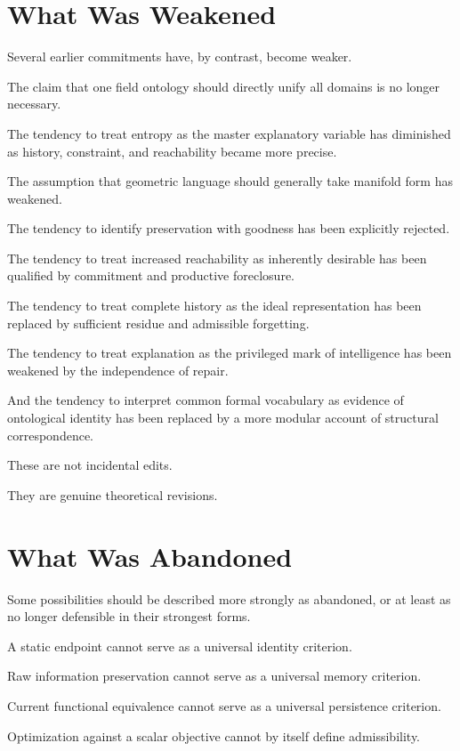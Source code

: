 \documentclass[11pt]{article}
\theoremstyle{remark}
\begin{document}
\section{What Was Weakened}

Several earlier commitments have, by contrast, become weaker.

The claim that one field ontology should directly unify all domains is no longer necessary.

The tendency to treat entropy as the master explanatory variable has diminished as history, constraint, and reachability became more precise.

The assumption that geometric language should generally take manifold form has weakened.

The tendency to identify preservation with goodness has been explicitly rejected.

The tendency to treat increased reachability as inherently desirable has been qualified by commitment and productive foreclosure.

The tendency to treat complete history as the ideal representation has been replaced by sufficient residue and admissible forgetting.

The tendency to treat explanation as the privileged mark of intelligence has been weakened by the independence of repair.

And the tendency to interpret common formal vocabulary as evidence of ontological identity has been replaced by a more modular account of structural correspondence.

These are not incidental edits.

They are genuine theoretical revisions.

\section{What Was Abandoned}

Some possibilities should be described more strongly as abandoned, or at least as no longer defensible in their strongest forms.

A static endpoint cannot serve as a universal identity criterion.

Raw information preservation cannot serve as a universal memory criterion.

Current functional equivalence cannot serve as a universal persistence criterion.

Optimization against a scalar objective cannot by itself define admissibility.
\end{document}
